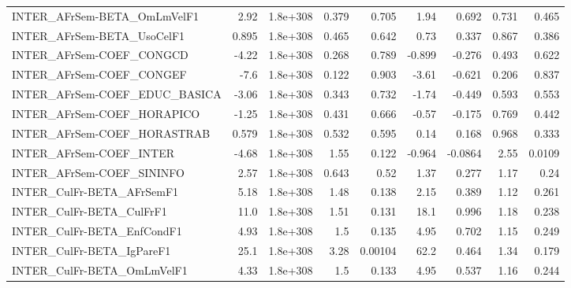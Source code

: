 \begin{tabular}{lrrrrrrrr}
INTER\_AFrSem-BETA\_OmLmVelF1           &        2.92 &     1.8e+308 &    0.379 &    0.705 &       1.94 &       0.692 &        0.731 &         0.465 \\
INTER\_AFrSem-BETA\_UsoCelF1            &       0.895 &     1.8e+308 &    0.465 &    0.642 &       0.73 &       0.337 &        0.867 &         0.386 \\
INTER\_AFrSem-COEF\_CONGCD              &       -4.22 &     1.8e+308 &    0.268 &    0.789 &     -0.899 &      -0.276 &        0.493 &         0.622 \\
INTER\_AFrSem-COEF\_CONGEF              &        -7.6 &     1.8e+308 &    0.122 &    0.903 &      -3.61 &      -0.621 &        0.206 &         0.837 \\
INTER\_AFrSem-COEF\_EDUC\_BASICA         &       -3.06 &     1.8e+308 &    0.343 &    0.732 &      -1.74 &      -0.449 &        0.593 &         0.553 \\
INTER\_AFrSem-COEF\_HORAPICO            &       -1.25 &     1.8e+308 &    0.431 &    0.666 &      -0.57 &      -0.175 &        0.769 &         0.442 \\
INTER\_AFrSem-COEF\_HORASTRAB           &       0.579 &     1.8e+308 &    0.532 &    0.595 &       0.14 &       0.168 &        0.968 &         0.333 \\
INTER\_AFrSem-COEF\_INTER               &       -4.68 &     1.8e+308 &     1.55 &    0.122 &     -0.964 &     -0.0864 &         2.55 &        0.0109 \\
INTER\_AFrSem-COEF\_SININFO             &        2.57 &     1.8e+308 &    0.643 &     0.52 &       1.37 &       0.277 &         1.17 &          0.24 \\
INTER\_CulFr-BETA\_AFrSemF1             &        5.18 &     1.8e+308 &     1.48 &    0.138 &       2.15 &       0.389 &         1.12 &         0.261 \\
INTER\_CulFr-BETA\_CulFrF1              &        11.0 &     1.8e+308 &     1.51 &    0.131 &       18.1 &       0.996 &         1.18 &         0.238 \\
INTER\_CulFr-BETA\_EnfCondF1            &        4.93 &     1.8e+308 &      1.5 &    0.135 &       4.95 &       0.702 &         1.15 &         0.249 \\
INTER\_CulFr-BETA\_IgPareF1             &        25.1 &     1.8e+308 &     3.28 &  0.00104 &       62.2 &       0.464 &         1.34 &         0.179 \\
INTER\_CulFr-BETA\_OmLmVelF1            &        4.33 &     1.8e+308 &      1.5 &    0.133 &       4.95 &       0.537 &         1.16 &         0.244 \\

\end{tabular}
